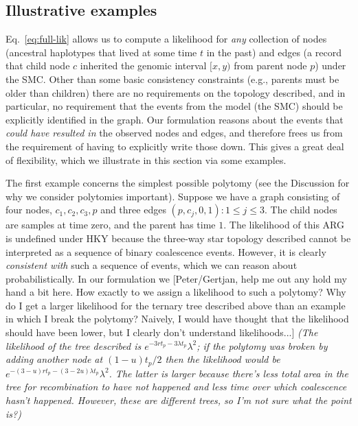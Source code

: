 \documentclass{article}
\newcommand{\comment}[1]{{\it \color{orange} (#1)}}
\begin{document}
\subsection*{Illustrative examples}

Eq.~\eqref{eq:full-lik} allows us to compute a likelihood for \emph{any}
collection of nodes (ancestral haplotypes that lived at some time 
$t$ in the past) and edges (a record that child node $c$ 
inherited the genomic interval $[x, y)$ from parent node $p$)
under the SMC. Other than some basic consistency constraints (e.g., parents
must be older than children) there are no requirements on the topology
described, and in particular, no requirement that the events from the 
model (the SMC) should be explicitly identified in the graph. Our 
formulation reasons about the events that \emph{could have resulted in}
the observed nodes and edges, and therefore frees us from the requirement
of having to explicitly write those down. This gives a great deal 
of flexibility, which we illustrate in this section via some examples.

The first example concerns the simplest possible polytomy (see
the Discussion for why we consider polytomies important).
Suppose we have a graph consisting of four nodes, $c_1,c_2,c_3,p$ and three edges
${(p, c_j, 0, 1): 1 \leq j \leq 3}$. The child nodes are samples at time
zero, and the parent has time $1$. The likelihood of this ARG is undefined
under HKY because the three-way star topology described cannot be interpreted as 
a sequence of binary coalescence events. However, it is clearly 
\emph{consistent with} such a sequence of events, which we can reason
about probabilistically. In our formulation we [Peter/Gertjan, help me 
out any hold my hand a bit here. How exactly to we assign a likelihood
to such a polytomy? Why do I get a larger likelihood for the ternary
tree described above than an example in which I break the polytomy? 
Naively, I would have thought that the likelihood should have been 
lower, but I clearly don't understand likelihoods...]
\comment{The likelihood of the tree described is $e^{-3rt_p-3\lambda t_p} \lambda^2$;
if the polytomy was broken by adding another node at $(1-u)t_p/2$ then
the likelihood would be $e^{-(3-u)rt_p - (3-2u)\lambda t_p} \lambda^2$.
The latter is larger because there's less total area in the tree
for recombination to have not happened and less time over which coalescence hasn't happened.
However, these are different trees, so I'm not sure what the point is?}
\end{document}
